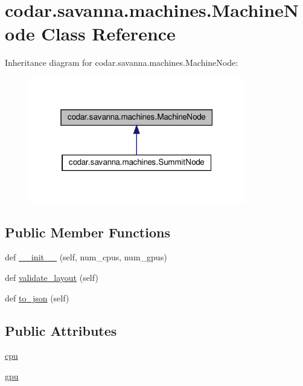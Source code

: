 \hypertarget{classcodar_1_1savanna_1_1machines_1_1_machine_node}{}\section{codar.\+savanna.\+machines.\+Machine\+Node Class Reference}
\label{classcodar_1_1savanna_1_1machines_1_1_machine_node}


Inheritance diagram for codar.\+savanna.\+machines.\+Machine\+Node\+:
\nopagebreak
\begin{figure}[H]
\begin{center}
\leavevmode
\includegraphics[width=268pt]{classcodar_1_1savanna_1_1machines_1_1_machine_node__inherit__graph}
\end{center}
\end{figure}
\subsection*{Public Member Functions}
\begin{DoxyCompactItemize}
\item 
def \hyperlink{classcodar_1_1savanna_1_1machines_1_1_machine_node_adc12f9810d54e9f497a4df2c3ab80577}{\+\_\+\+\_\+init\+\_\+\+\_\+} (self, num\+\_\+cpus, num\+\_\+gpus)
\item 
def \hyperlink{classcodar_1_1savanna_1_1machines_1_1_machine_node_a32ee6eb242c8dff720e89ffbd772cf40}{validate\+\_\+layout} (self)
\item 
def \hyperlink{classcodar_1_1savanna_1_1machines_1_1_machine_node_a9598980dfb90152c1f2091fae5dd1299}{to\+\_\+json} (self)
\end{DoxyCompactItemize}
\subsection*{Public Attributes}
\begin{DoxyCompactItemize}
\item 
\hyperlink{classcodar_1_1savanna_1_1machines_1_1_machine_node_a084bb8daed740edd8b7dd37f8d1f9bab}{cpu}
\item 
\hyperlink{classcodar_1_1savanna_1_1machines_1_1_machine_node_a2ccec1288c1472fc0a5af7787e48da22}{gpu}
\end{DoxyCompactItemize}


